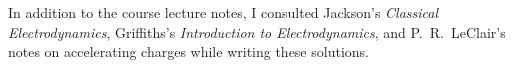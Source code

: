 \documentclass[11pt]{article}
\begin{document}
\newcommand{\vo}{v^0}
\newcommand{\vq}{v^1}
\newcommand{\vw}{v^2}
\newcommand{\ve}{v^3}

\newcommand{\intsR}{\int_\sR}
\newcommand{\dfx}{\dd[4]{x}}
\newcommand{\dxo}{\dd{x^0}}
\newcommand{\dxq}{\dd{x^1}}
\newcommand{\dxw}{\dd{x^2}}
\newcommand{\dxe}{\dd{x^3}}

\newcommand{\Grettx}{\Gret(t, \vx; t', \vx')}
\newcommand{\Gadvtx}{\Gadv(t, \vx; t'', \vx'')}
 




\vfill
In addition to the course lecture notes, I consulted Jackson's \emph{Classical Electrodynamics}, Griffiths's \emph{Introduction to Electrodynamics}, and P.~R.~LeClair's notes on accelerating charges while writing these solutions.
\end{document}
